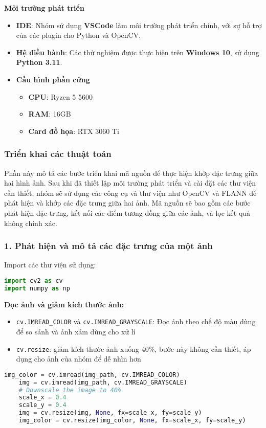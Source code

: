 \textbf{Môi trường phát triển}
\begin{itemize}
	\item \textbf{IDE}: Nhóm sử dụng \textbf{VSCode} làm môi trường phát triển chính, với sự hỗ trợ của các plugin cho Python và OpenCV.
	\item \textbf{Hệ điều hành}: Các thử nghiệm được thực hiện trên \textbf{Windows 10}, sử dụng \textbf{Python 3.11}.
	\item \textbf{Cấu hình phần cứng}
	\begin{itemize}
		\item \textbf{CPU}: Ryzen 5 5600
		\item \textbf{RAM}: 16GB
		\item \textbf{Card đồ họa}: RTX 3060 Ti
	\end{itemize}
\end{itemize}

\subsubsection{Triển khai các thuật toán}
Phần này mô tả các bước triển khai mã nguồn để thực hiện khớp đặc trưng giữa hai hình ảnh. Sau khi đã thiết lập môi trường phát triển và cài đặt các thư viện cần thiết, nhóm sẽ sử dụng các công cụ và thư viện như OpenCV và FLANN để phát hiện và khớp các đặc trưng giữa hai ảnh. Mã nguồn sẽ bao gồm các bước phát hiện đặc trưng, kết nối các điểm tương đồng giữa các ảnh, và lọc kết quả không chính xác.
\subsubsection*{1. Phát hiện và mô tả các đặc trưng của một ảnh}
Import các thư viện sử dụng:
\begin{lstlisting}[language=Python]
import cv2 as cv
import numpy as np
\end{lstlisting}

\textbf{Đọc ảnh và giảm kích thước ảnh:}
\begin{itemize}
	\item \texttt{cv.IMREAD\_COLOR} và \texttt{cv.IMREAD\_GRAYSCALE}: Đọc ảnh theo chế độ màu dùng để so sánh và ảnh xám dùng cho xử lí
	\item \texttt{cv.resize}: giảm kích thước ảnh xuống 40\%, bước này không cần thiết, áp dụng cho ảnh của nhóm để dễ nhìn hơn
\end{itemize}

\begin{lstlisting}[language=Python]
	img_color = cv.imread(img_path, cv.IMREAD_COLOR)
	img = cv.imread(img_path, cv.IMREAD_GRAYSCALE)
	# Downscale the image to 40%
	scale_x = 0.4
	scale_y = 0.4
	img = cv.resize(img, None, fx=scale_x, fy=scale_y)
	img_color = cv.resize(img_color, None, fx=scale_x, fy=scale_y)
\end{lstlisting}


